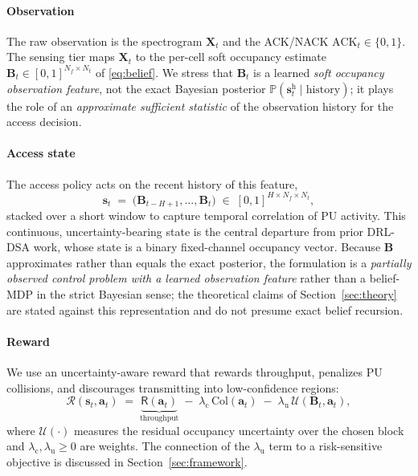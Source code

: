 \documentclass[journal]{IEEEtran}
\newcommand{\Prob}{\mathbb{P}}
\newcommand{\spec}{\bm{X}}                 %
\newcommand{\Nf}{N_f}                      %
\newcommand{\Nt}{N_t}                      %
\newcommand{\belmap}{\bm{B}}               %
\newcommand{\act}{\bm{a}}                  %
\newcommand{\state}{\bm{s}}                %
\newcommand{\histlen}{H}                   %
\newcommand{\rew}{r}                       %
\renewcommand{\rew}{\mathcal{R}}           %
\newcommand{\thru}{\mathsf{R}}             %
\newcommand{\hidden}{\bm{s}^{\mathrm{h}}}   %
\begin{document}
\paragraph*{Observation} The raw observation is the spectrogram $\spec_t$ and
the ACK/NACK $\mathrm{ACK}_t\in\{0,1\}$. The sensing tier maps $\spec_t$ to
the per-cell soft occupancy estimate $\belmap_t\in[0,1]^{\Nf\times\Nt}$ of
\eqref{eq:belief}. We stress that $\belmap_t$ is a learned \emph{soft
occupancy observation feature}, not the exact Bayesian posterior
$\Prob(\hidden_t\mid\text{history})$; it plays the role of an
\emph{approximate sufficient statistic} of the observation history for the
access decision.

\paragraph*{Access state} The access policy acts on the recent history of
this feature,
\begin{equation}
\state_t \;=\; \bigl(\belmap_{t-\histlen+1},\dots,\belmap_{t}\bigr)
\;\in\; [0,1]^{\histlen \times \Nf \times \Nt},
\label{eq:state}
\end{equation}
stacked over a short window to capture temporal correlation of PU activity.
This continuous, uncertainty-bearing state is the central departure from
prior DRL-DSA work, whose state is a binary fixed-channel occupancy vector.
Because $\belmap$ approximates rather than equals the exact posterior, the
formulation is a \emph{partially observed control problem with a learned
observation feature} rather than a belief-MDP in the strict Bayesian sense;
the theoretical claims of Section~\ref{sec:theory} are stated against this
representation and do not presume exact belief recursion.

\paragraph*{Reward} We use an uncertainty-aware reward that rewards
throughput, penalizes PU collisions, and discourages transmitting into
low-confidence regions:
\begin{equation}
\rew(\state_t,\act_t) \;=\;
\underbrace{\thru(\act_t)}_{\text{throughput}}
\;-\; \lambda_{\mathrm{c}}\,\mathrm{Col}(\act_t)
\;-\; \lambda_{\mathrm{u}}\,\mathcal{U}\!\left(\belmap_t,\act_t\right),
\label{eq:reward}
\end{equation}
where $\mathcal{U}(\cdot)$ measures the residual occupancy uncertainty over
the chosen block and $\lambda_{\mathrm{c}},\lambda_{\mathrm{u}}\ge 0$ are
weights. The connection of the $\lambda_{\mathrm{u}}$ term to a
risk-sensitive objective is discussed in Section~\ref{sec:framework}.
\end{document}
